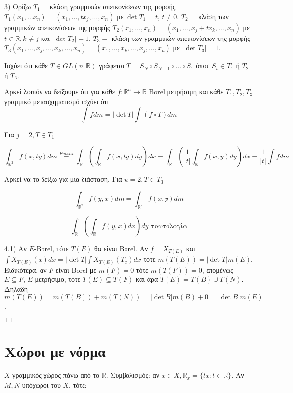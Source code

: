     3) Ορίζω $T_1$ = κλάση γραμμικών απεικονίσεων της μορφής $T_1(x_1,\ldots x_n) = (x_1,\ldots, tx_j,\ldots ,x_n)$ με $\det T_1 = t$, $t\neq 0$. $T_2$ = κλάση των γραμμικών απεικονίσεων της μορφής $T_2(x_1,\ldots,x_n) = (x_1,\ldots,x_j +tx_k,\ldots,x_n)$ με $t \in \mathbb R, k\neq j$ και $|\det T_2| = 1$. $T_3 = $ κλάση των γραμμικών απεικονίσεων της μορφής $T_3 (x_1,\ldots,x_j,\ldots,x_k,\ldots,x_n) = (x_1,\ldots,x_k,\ldots,x_j,\ldots,x_n)$ με $|\det T_3| = 1$.

    
    Ισχύει ότι κάθε $T \in GL(n,\mathbb R)$ γράφεται $T=S_N \circ S_{N-1} \circ \ldots \circ S_1$ όπου $S_i \in T_1$ ή $T_2$ ή $T_3$.

    
    Αρκεί λοιπόν να δείξουμε ότι για κάθε $f: \mathbb R^n \rightarrow \mathbb R$ Borel μετρήσιμη και κάθε $T_1,T_2,T_3$ γραμμικό μετασχηματισμό ισχύει ότι
    $$\int f dm = |\det T| \int (f\circ T)dm$$

    
    Για $j=2, T \in T_1$

    $$ \int_{\mathbb R^2} f(x,ty) dm \overset{ Fubini }{=} \int_{\mathbb R}\left( \int_{\mathbb{R}} f(x,ty) dy\right)dx = \int_{\mathbb{R}} \left( \frac{1}{|t|} \int_{\mathbb{R}} f(x,y)dy\right) dx = \frac{1}{|t|} \int fdm $$

    Αρκεί να το δείξω για μια διάσταση. Για $n=2, T\in T_3$

    $$\int_{\mathbb R^2} f(y,x) dm = \int_{\mathbb R^2} f(x,y)dm$$

    $$\int_{\mathbb{R}} \left( \int_{\mathbb{R}} f(y,x) dx\right) dy \textrm{ ταυτολογία}$$


    4.1) Αν $E$-Borel, τότε $T(E)$ θα είναι Borel. Αν $f = X_{T(E)}$ και $\int X_{T(E)} (x) dx = |\det T| \int X_{T(E)} (T_x) dx$ τότε $m(T(E)) = |\det T| m(E)$. Ειδικότερα, αν $F$ είναι Borel με $m(F) = 0$ τότε $m(T(F)) = 0$, επομένως $E \subseteq F$, $E$ μετρήσιμο, τότε $T(E) \subseteq T(F)$ και άρα $T(E) = T(B) \cup T(N)$. Δηλαδή $m(T(E)) = m(T(B)) + m(T(N)) = |\det B| m(B) + 0 = |\det B| m(E)$.
    
\hfill $\Box$


\pagebreak
\section{ Χώροι με νόρμα}


$X$ γραμμικός χώρος πάνω από το $\mathbb R$. Συμβολισμός: αν $x \in X, \mathbb R_x = \{ tx: t\in \mathbb{R}\}$. Αν $M,N$ υπόχωροι του $X$, τότε:

